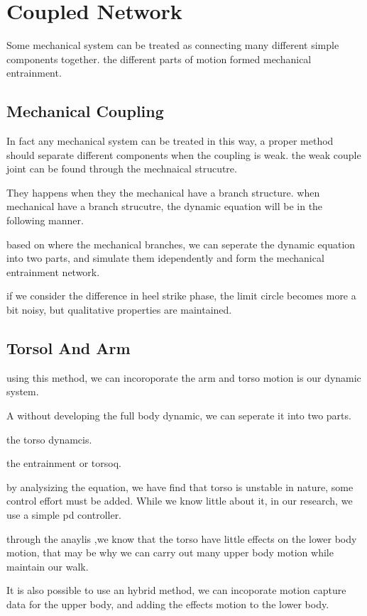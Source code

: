 \section{Coupled Network}
Some mechanical system can be treated as connecting many different simple components together.
the different parts of motion formed mechanical entrainment.

\subsection*{Mechanical Coupling}
In fact any mechanical system can be treated in this way,
a proper method should separate different components when the coupling is weak.
the weak couple joint can be found through the mechnaical strucutre.

They happens when they the mechanical have a branch structure.
when mechanical have a branch strucutre,
the dynamic equation will be in the following manner.


based on where the mechanical branches, we can seperate the dynamic equation into two parts,
and simulate them idependently and form the mechanical entrainment network.


if we consider the difference in heel strike phase,
the limit circle becomes more a bit noisy, but qualitative properties are maintained.



\subsection*{Torsol And Arm}
using this method, we can incoroporate the arm and torso motion is our dynamic system.

A without developing the full body dynamic, we can seperate it into two parts.

the torso dynamcis.

the entrainment or torsoq.


by analysizing the equation,
we have find that torso is unstable in nature,
some control effort must be added.
While we know little about it,
in our research, we use a simple pd controller.


through the anaylis ,we know that the torso have little effects on the lower body motion,
that may be why we can carry out many upper body motion while maintain our walk.

It is also possible to use an hybrid method,
we can incoporate motion capture data for the upper body, and adding the effects motion to the lower body.


